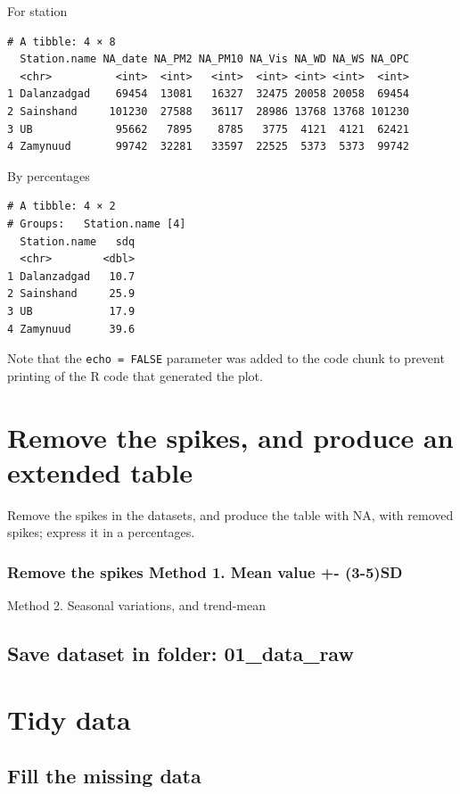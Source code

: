 \documentclass[
]{agujournal2019}
\begin{document}
For station

\begin{verbatim}
# A tibble: 4 × 8
  Station.name NA_date NA_PM2 NA_PM10 NA_Vis NA_WD NA_WS NA_OPC
  <chr>          <int>  <int>   <int>  <int> <int> <int>  <int>
1 Dalanzadgad    69454  13081   16327  32475 20058 20058  69454
2 Sainshand     101230  27588   36117  28986 13768 13768 101230
3 UB             95662   7895    8785   3775  4121  4121  62421
4 Zamynuud       99742  32281   33597  22525  5373  5373  99742
\end{verbatim}

By percentages

\begin{verbatim}
# A tibble: 4 × 2
# Groups:   Station.name [4]
  Station.name   sdq
  <chr>        <dbl>
1 Dalanzadgad   10.7
2 Sainshand     25.9
3 UB            17.9
4 Zamynuud      39.6
\end{verbatim}

Note that the \texttt{echo\ =\ FALSE} parameter was added to the code
chunk to prevent printing of the R code that generated the plot.

\section{Remove the spikes, and produce an extended
table}\label{remove-the-spikes-and-produce-an-extended-table-1}

Remove the spikes in the datasets, and produce the table with NA, with
removed spikes; express it in a percentages.

\subsubsection{Remove the spikes Method 1. Mean value +-
(3-5)SD}\label{remove-the-spikes-method-1.-mean-value---3-5sd}

Method 2. Seasonal variations, and trend-mean

\subsection{Save dataset in folder:
01\_data\_raw}\label{save-dataset-in-folder-01_data_raw-1}

\section{Tidy data}\label{tidy-data-1}

\subsection{Fill the missing data}\label{fill-the-missing-data-1}
\end{document}
